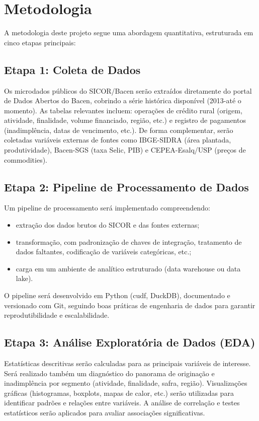 \section{Metodologia}

A metodologia deste projeto segue uma abordagem quantitativa, estruturada em cinco etapas principais:

\subsection{Etapa 1: Coleta de Dados}

Os microdados públicos do SICOR/Bacen serão extraídos diretamente do portal de Dados Abertos do Bacen, cobrindo a série histórica disponível (2013-até o momento). As tabelas relevantes incluem: operações de crédito rural (origem, atividade, finalidade, volume financiado, região, etc.) e registro de pagamentos (inadimplência, datas de vencimento, etc.). De forma complementar, serão coletadas variáveis externas de fontes como IBGE-SIDRA (área plantada, produtividade), Bacen-SGS (taxa Selic, PIB) e CEPEA-Esalq/USP (preços de commodities).

\subsection{Etapa 2: Pipeline de Processamento de Dados}

Um pipeline de processamento será implementado compreendendo:
\begin{itemize}
    \item[(i)] extração dos dados brutos do SICOR e das fontes externas;
    \item[(ii)] transformação, com padronização de chaves de integração, tratamento de dados faltantes, codificação de variáveis categóricas, etc.;
    \item[(iii)] carga em um ambiente de analítico estruturado (data warehouse ou data lake).
\end{itemize}
O pipeline será desenvolvido em Python (cudf, DuckDB), documentado e versionado com Git, seguindo boas práticas de engenharia de dados para garantir reprodutibilidade e escalabilidade.

\subsection{Etapa 3: Análise Exploratória de Dados (EDA)}

Estatísticas descritivas serão calculadas para as principais variáveis de interesse. Será realizado também um diagnóstico do panorama de originação e inadimplência por segmento (atividade, finalidade, safra, região). Visualizações gráficas (histogramas, boxplots, mapas de calor, etc.) serão utilizadas para identificar padrões e relações entre variáveis. A análise de correlação e testes estatísticos serão aplicados para avaliar associações significativas.

